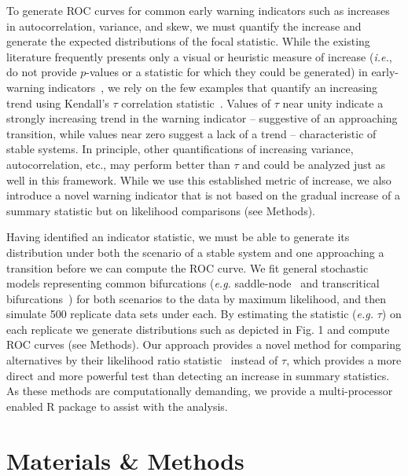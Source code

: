 \documentclass[authoryear,preprint,11pt]{elsarticle}
\begin{document}
To generate ROC curves for common early warning indicators such as 
increases in autocorrelation, variance, and skew, 
we must quantify the increase and generate the expected distributions of the focal statistic.  
While the existing literature frequently presents only a 
visual or heuristic measure of increase (\emph{i.e.}, do not provide $p$-values or a statistic for which they could be generated) in early-warning indicators~\citep{Scheffer2009, Drake2010, Carpenter2011, Carpenter2006}, 
we rely on the few examples that quantify an increasing trend using Kendall's $\tau$ correlation statistic~\citep{Dakos2008, Dakos2011, Dakos2009}.
Values of $\tau$ near unity indicate a strongly increasing trend in the warning indicator --
suggestive of an approaching transition, while values near zero suggest a lack of a trend -- characteristic of stable systems.
In principle, other quantifications of increasing variance, autocorrelation, etc.,
may perform better than $\tau$ and could be analyzed just as well in this framework. 
While we use this established metric of increase, we also introduce a novel warning indicator
that is not based on the gradual increase of a summary statistic but on likelihood comparisons (see Methods).  

Having identified an indicator statistic,
we must be able to generate its distribution under both the scenario of a stable system and 
one approaching a transition before we can compute the ROC curve.
We fit general stochastic models representing common bifurcations
(\emph{e.g.} saddle-node~\citep{Scheffer2009, Guttal2008a, VanNes2007, Biggs2009} and transcritical bifurcations~\citep{Drake2010})
for both scenarios to the data by maximum likelihood, and then simulate 500 replicate data sets under each⁠. 
By estimating the statistic (\emph{e.g.} $\tau$) on each replicate we generate distributions such as depicted in Fig. 1 and compute ROC curves (see Methods).
Our approach provides a novel method for comparing alternatives by their likelihood ratio statistic~\citep{Cox1961}⁠ instead of $\tau$,
which provides a more direct and more powerful test than detecting an increase in summary statistics.
As these methods are computationally demanding, we provide a multi-processor enabled R package to assist with the analysis. 

\section{Materials \& Methods}\label{methods}
\end{document}

